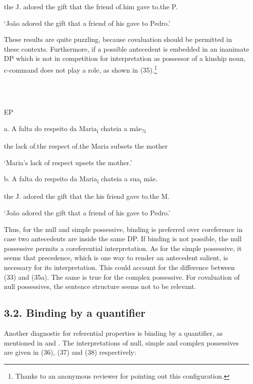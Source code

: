 \documentclass[output=paper]{langsci/langscibook}
\begin{document}
the J. adored the gift that the friend of.him gave to.the P.

‘João adored the gift that a friend of his gave to Pedro.’

These results are quite puzzling, because covaluation should be permitted in these contexts. Furthermore, if a possible antecedent is embedded in an inanimate DP which is not in competition for interpretation as possessor of a kinship noun, c-command does not play a role, as shown in (35).\footnote{Thanks to an anonymous reviewer for pointing out this configuration.}

\ea%
    \label{ex:key:35}
    \gll\\
        \\
    \glt
    \z

          EP

a.  A falta do respeito da Maria\textsubscript{i} chateia a mãe\textsubscript{?i}

the lack of.the respect of.the Maria subsets the mother

‘Maria’s lack of respect upsets the mother.’

  b.  A falta do respeito da Maria\textsubscript{i} chateia a sua\textsubscript{i} mãe.

the J. adored the gift that the his friend gave to.the M.

‘João adored the gift that a friend of his gave to Pedro.’

Thus, for the null and simple possessive, binding is preferred over coreference in case two antecedents are inside the same DP. If binding is not possible, the null possessive permits a coreferential interpretation. As for the simple possessive, it seems that precedence, which is one way to render an antecedent salient, is necessary for its interpretation. This could account for the difference between (33) and (35a). The same is true for the complex possessive. For covaluation of null possessives, the sentence structure seems not to be relevant.

\subsection{ 3.2. Binding by a quantifier}

Another diagnostic for referential properties is binding by a quantifier, as mentioned in \citet{Barker2011} and \citet{MateusEtAl2003}. The interpretations of null, simple and complex possessives are given in (36), (37) and (38) respectively:
\end{document}
